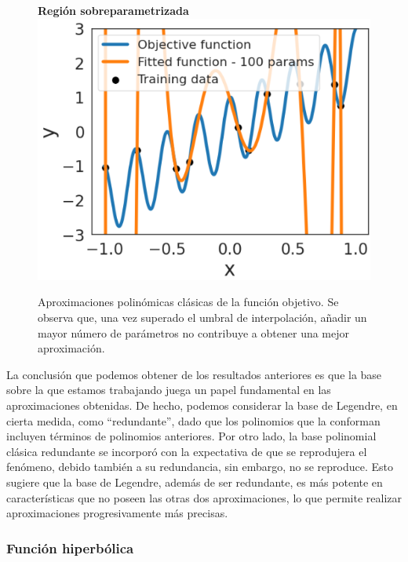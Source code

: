 \begin{figure}[h]
    \begin{minipage}{0.32\textwidth}
        \centering
        \textbf{Región sobreparametrizada} \\[0.5ex] 
        \includegraphics[width=\linewidth]{img/experiments/OLS1.3.png}
    \end{minipage}
    \caption[Aproximaciones polinómicas clásicas de la función objetivo.]{Aproximaciones polinómicas clásicas de la función objetivo. Se observa que, una vez superado el umbral de interpolación, añadir un mayor número de parámetros no contribuye a obtener una mejor aproximación.}\label{fig:polynomial1DD}
\end{figure}

La conclusión que podemos obtener de los resultados anteriores es que la base sobre la que estamos trabajando juega un papel fundamental en las aproximaciones obtenidas. De hecho, podemos considerar la base de Legendre, en cierta medida, como ``redundante'', dado que los polinomios que la conforman incluyen términos de polinomios anteriores. Por otro lado, la base polinomial clásica redundante se incorporó con la expectativa de que se reprodujera el fenómeno, debido también a su redundancia, sin embargo, no se reproduce. Esto sugiere que la base de Legendre, además de ser redundante, es más potente en características que no poseen las otras dos aproximaciones, lo que permite realizar aproximaciones progresivamente más precisas.

\subsubsection{Función hiperbólica}\label{subsubsec:funcion-hiperbolica}


